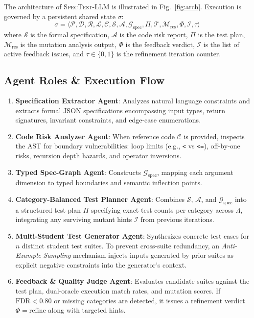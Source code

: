 \documentclass[conference]{IEEEtran}
\begin{document}
The architecture of \textsc{SpecTest-LLM} is illustrated in Fig.~\ref{fig:arch}. Execution is governed by a persistent shared state $\sigma$:
\begin{equation}
    \sigma = \langle \mathcal{P}, \mathcal{D}, \mathcal{R}, \mathcal{L}, \mathcal{C}, \mathcal{S}, \mathcal{A}, \mathcal{G}_{\text{spec}}, \Pi, \mathcal{T}, \mathcal{M}_{\text{res}}, \Phi, \mathcal{I}, \tau \rangle
\end{equation}
where $\mathcal{S}$ is the formal specification, $\mathcal{A}$ is the code risk report, $\Pi$ is the test plan, $\mathcal{M}_{\text{res}}$ is the mutation analysis output, $\Phi$ is the feedback verdict, $\mathcal{I}$ is the list of active feedback issues, and $\tau \in \{0, 1\}$ is the refinement iteration counter.

\subsection{Agent Roles \& Execution Flow}
\begin{enumerate}
    \item \textbf{Specification Extractor Agent}: Analyzes natural language constraints and extracts formal JSON specifications encompassing input types, return signatures, invariant constraints, and edge-case enumerations.
    \item \textbf{Code Risk Analyzer Agent}: When reference code $\mathcal{C}$ is provided, inspects the AST for boundary vulnerabilities: loop limits (e.g., \texttt{<} vs \texttt{<=}), off-by-one risks, recursion depth hazards, and operator inversions.
    \item \textbf{Typed Spec-Graph Agent}: Constructs $\mathcal{G}_{\text{spec}}$, mapping each argument dimension to typed boundaries and semantic inflection points.
    \item \textbf{Category-Balanced Test Planner Agent}: Combines $\mathcal{S}$, $\mathcal{A}$, and $\mathcal{G}_{\text{spec}}$ into a structured test plan $\Pi$ specifying exact test counts per category across $\Lambda$, integrating any surviving mutant hints $\mathcal{I}$ from previous iterations.
    \item \textbf{Multi-Student Test Generator Agent}: Synthesizes concrete test cases for $n$ distinct student test suites. To prevent cross-suite redundancy, an \emph{Anti-Example Sampling} mechanism injects inputs generated by prior suites as explicit negative constraints into the generator's context.
    \item \textbf{Feedback \& Quality Judge Agent}: Evaluates candidate suites against the test plan, dual-oracle execution match rates, and mutation scores. If $\text{FDR} < 0.80$ or missing categories are detected, it issues a refinement verdict $\Phi = \text{refine}$ along with targeted hints.
\end{enumerate}
\end{document}
